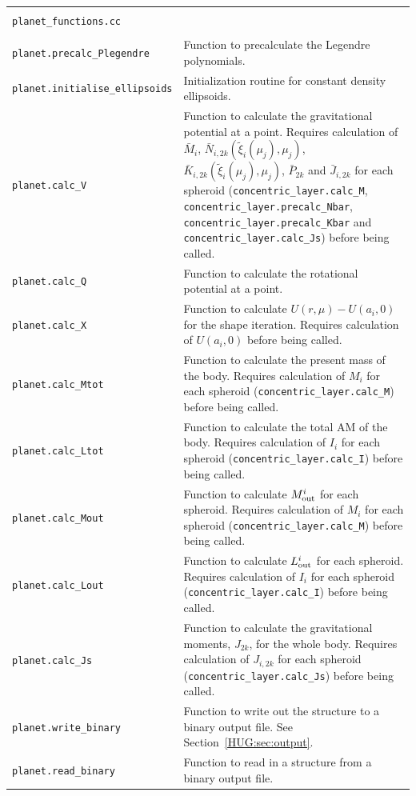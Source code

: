 \documentclass[11pt, oneside]{article}   	%
\begin{document}
\begin{longtable}{l p{10cm}}
\multicolumn{2}{l}{} \\
\multicolumn{2}{l}{\texttt{planet\_functions.cc}} \\
\hline \\
\texttt{planet.precalc\_Plegendre} & Function to precalculate the Legendre polynomials. \\
\texttt{planet.initialise\_ellipsoids} & Initialization routine for constant density ellipsoids. \\
\texttt{planet.calc\_V} & Function to calculate the gravitational potential at a point. Requires calculation of $\bar{M}_i$, $\bar{N}_{i,2k} (\tilde{\xi}_i (\mu_j), \mu_j)$, $\bar{K}_{i,2k} (\tilde{\xi}_i (\mu_j), \mu_j)$, $\bar{P}_{2k}$ and $\bar{J}_{i,2k}$ for each spheroid (\texttt{concentric\_layer.calc\_M}, \texttt{concentric\_layer.precalc\_Nbar}, \texttt{concentric\_layer.precalc\_Kbar} and \texttt{concentric\_layer.calc\_Js}) before being called. \\
\texttt{planet.calc\_Q} & Function to calculate the rotational potential at a point. \\
\texttt{planet.calc\_X} & Function to calculate $U(r, \mu)-U(a_i, 0)$ for the shape iteration. Requires calculation of $U(a_i, 0)$ before being called. \\
\texttt{planet.calc\_Mtot} & Function to calculate the present mass of the body. Requires calculation of $M_i$ for each spheroid (\texttt{concentric\_layer.calc\_M}) before being called. \\
\texttt{planet.calc\_Ltot} & Function to calculate the total AM of the body. Requires calculation of $I_i$ for each spheroid (\texttt{concentric\_layer.calc\_I}) before being called. \\
\texttt{planet.calc\_Mout} & Function to calculate $M_{\rm out}^i$ for each spheroid. Requires calculation of $M_i$ for each spheroid (\texttt{concentric\_layer.calc\_M}) before being called.  \\
\texttt{planet.calc\_Lout} & Function to calculate $L_{\rm out}^i$ for each spheroid. Requires calculation of $I_i$ for each spheroid (\texttt{concentric\_layer.calc\_I}) before being called. \\
\texttt{planet.calc\_Js} & Function to calculate the gravitational moments, $J_{2k}$, for the whole body. Requires calculation of $J_{i, 2k}$ for each spheroid (\texttt{concentric\_layer.calc\_Js}) before being called.\\
\texttt{planet.write\_binary} & Function to write out the structure to a binary output file. See Section~\ref{HUG:sec:output}. \\
\texttt{planet.read\_binary} & Function to read in a structure from a binary output file. \\


\end{longtable}
\end{document}
